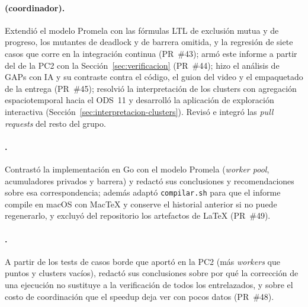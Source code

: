 \paragraph{\nombreRody{} (coordinador).} Extendió el modelo Promela con las fórmulas LTL de
exclusión mutua y de progreso, los mutantes de deadlock y de barrera omitida, y la regresión de siete
casos que corre en la integración continua (PR~\#43); armó este informe a partir del de la PC2 con
la Sección~\ref{sec:verificacion} (PR~\#44); hizo el análisis de GAPs con IA y su contraste contra
el código, el guion del video y el empaquetado de la entrega (PR~\#45); resolvió la interpretación de
los clusters con agregación espaciotemporal hacia el ODS~11 y desarrolló la aplicación de
exploración interactiva (Sección~\ref{sec:interpretacion-clusters}). Revisó e integró las \emph{pull requests} del resto del grupo.

\paragraph{\nombreDayana.} Contrastó la implementación en Go con el modelo Promela (\emph{worker
pool}, acumuladores privados y barrera) y redactó sus conclusiones y recomendaciones sobre esa
correspondencia; además adaptó \texttt{compilar.sh} para que el informe compile en macOS con MacTeX
y conserve el historial anterior si no puede regenerarlo, y excluyó del repositorio los artefactos
de LaTeX (PR~\#49).

\paragraph{\nombreTercero.} A partir de los tests de casos borde que aportó en la PC2 (más
\emph{workers} que puntos y clusters vacíos), redactó sus conclusiones sobre por qué la corrección de
una ejecución no sustituye a la verificación de todos los entrelazados, y sobre el costo de
coordinación que el speedup deja ver con pocos datos (PR~\#48).
